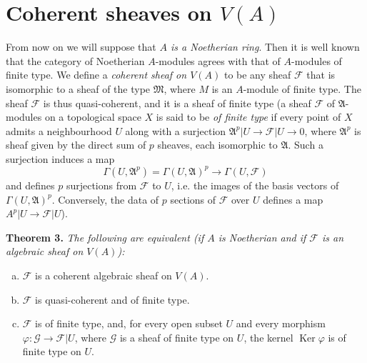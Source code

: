 \documentclass{article}
\newenvironment{itenv}[1]
  {\phantomsection\par\medskip\noindent\textbf{#1.}\itshape}
  {\medskip}
\newcommand{\scr}[1]{{\mathscr{#1}}}
\DeclareMathOperator{\Ker}{Ker}
\newcommand{\oldpage}[1]{\marginpar{\footnotesize$\Big\vert$ \textit{p.~#1}}}
\begin{document}
\section{Coherent sheaves on \texorpdfstring{$V(A)$}{V(A)}}
\label{section4}

\oldpage{1-09}
From now on we will suppose that \emph{$A$ is a Noetherian ring}.
Then it is well known that the category of Noetherian $A$-modules agrees with that of $A$-modules of finite type.
We define a \emph{coherent sheaf on $V(A)$} to be any sheaf $\scr{F}$ that is isomorphic to a sheaf of the type $\mathfrak{M}$, where $M$ is an $A$-module of finite type.
The sheaf $\scr{F}$ is thus quasi-coherent, and it is a sheaf of finite type
(a sheaf $\scr{F}$ of $\mathfrak{A}$-modules on a topological space $X$ is said to be \emph{of finite type} if every point of $X$ admits a neighbourhood $U$ along with a surjection $\mathfrak{A}^p|U\to\scr{F}|U\to0$, where $\mathfrak{A}^p$ is sheaf given by the direct sum of $p$ sheaves, each isomorphic to $\mathfrak{A}$.
Such a surjection induces a map
\[
  \Gamma(U,\mathfrak{A}^p) = \Gamma(U,\mathfrak{A})^p \to \Gamma(U,\scr{F})
\]
and defines $p$ surjections from $\scr{F}$ to $U$, i.e. the images of the basis vectors of $\Gamma(U,\mathfrak{A})^p$.
Conversely, the data of $p$ sections of $\scr{F}$ over $U$ defines a map $A^p|U\to\scr{F}|U$).

\begin{itenv}{Theorem 3}
\label{theorem3}
  The following are equivalent (if $A$ is Noetherian and if $\scr{F}$ is an algebraic sheaf on $V(A)$):
  \begin{enumerate}[(a)]
    \item $\scr{F}$ is a coherent algebraic sheaf on $V(A)$.
    \item $\scr{F}$ is quasi-coherent and of finite type.
    \item $\scr{F}$ is of finite type, and, for every open subset $U$ and every morphism $\varphi\colon\scr{G}\to\scr{F}|U$, where $\scr{G}$ is a sheaf of finite type on $U$, the kernel $\Ker\varphi$ is of finite type on $U$.
  \end{enumerate}
\end{itenv}
\end{document}
